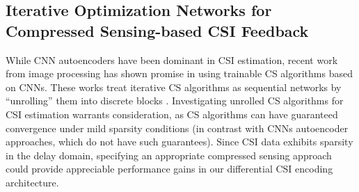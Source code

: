 \subsection{Iterative Optimization Networks for Compressed Sensing-based CSI Feedback} \label{sec:iter-cs}

 
While CNN autoencoders have been dominant in CSI estimation, recent work from image processing has shown promise in using trainable CS algorithms based on CNNs. These works treat iterative CS algorithms as sequential networks by ``unrolling'' them into discrete blocks \cite{ref:yang2016deep, ref:zhang2018ista}. Investigating unrolled CS algorithms for CSI estimation warrants consideration, as CS algorithms can have guaranteed convergence under mild sparsity conditions (in contrast with CNNs autoencoder approaches, which do not have such guarantees). Since CSI data exhibits sparsity in the delay domain, specifying an appropriate compressed sensing approach could provide appreciable performance gains in our differential CSI encoding architecture. 

